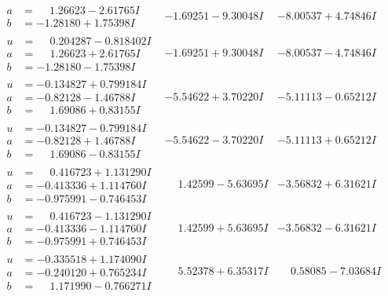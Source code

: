 \documentclass[1p]{elsarticle_modified}
\theoremstyle{definition}
\begin{document}
$$\begin{array}{c|c|c}
\begin{aligned}
a &= \phantom{-}1.26623 - 2.61765 I \\
b &= -1.28180 + 1.75398 I\end{aligned}
 & -1.69251 - 9.30048 I & -8.00537 + 4.74846 I \\ \hline\begin{aligned}
u &= \phantom{-}0.204287 - 0.818402 I \\
a &= \phantom{-}1.26623 + 2.61765 I \\
b &= -1.28180 - 1.75398 I\end{aligned}
 & -1.69251 + 9.30048 I & -8.00537 - 4.74846 I \\ \hline\begin{aligned}
u &= -0.134827 + 0.799184 I \\
a &= -0.82128 - 1.46788 I \\
b &= \phantom{-}1.69086 + 0.83155 I\end{aligned}
 & -5.54622 + 3.70220 I & -5.11113 - 0.65212 I \\ \hline\begin{aligned}
u &= -0.134827 - 0.799184 I \\
a &= -0.82128 + 1.46788 I \\
b &= \phantom{-}1.69086 - 0.83155 I\end{aligned}
 & -5.54622 - 3.70220 I & -5.11113 + 0.65212 I \\ \hline\begin{aligned}
u &= \phantom{-}0.416723 + 1.131290 I \\
a &= -0.413336 + 1.114760 I \\
b &= -0.975991 - 0.746453 I\end{aligned}
 & \phantom{-}1.42599 - 5.63695 I & -3.56832 + 6.31621 I \\ \hline\begin{aligned}
u &= \phantom{-}0.416723 - 1.131290 I \\
a &= -0.413336 - 1.114760 I \\
b &= -0.975991 + 0.746453 I\end{aligned}
 & \phantom{-}1.42599 + 5.63695 I & -3.56832 - 6.31621 I \\ \hline\begin{aligned}
u &= -0.335518 + 1.174090 I \\
a &= -0.240120 + 0.765234 I \\
b &= \phantom{-}1.171990 - 0.766271 I\end{aligned}
 & \phantom{-}5.52378 + 6.35317 I & \phantom{-}0.58085 - 7.03684 I \\ \hline\begin{aligned}

\end{aligned}
\end{array}$$
\end{document}
